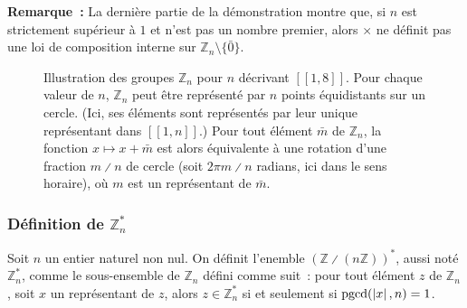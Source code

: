 \medskip

\noindent\textbf{Remarque :} La dernière partie de la démonstration montre que, si $n$ est strictement supérieur à $1$ et n'est pas un nombre premier, alors $\times$ ne définit pas une loi de composition interne sur $\mathbb{Z}_n \setminus \lbrace \bar{0} \rbrace$.

\begin{figure}
    \centering
    \def\maxN{8}
    \caption{Illustration des groupes $\mathbb{Z}_n$ pour $n$ décrivant $[\![1, \maxN]\!]$. 
        Pour chaque valeur de $n$, $\mathbb{Z}_n$ peut être représenté par $n$ points équidistants sur un cercle. 
        (Ici, ses éléments sont représentés par leur unique représentant dans $[\![1, n]\!]$.) 
        Pour tout élément $\bar{m}$ de $\mathbb{Z}_n$, la fonction $x \mapsto x + \bar{m}$ est alors équivalente à une rotation d'une fraction $m \divslash n$ de cercle (soit $2 \pi m \divslash n$ radians, ici dans le sens horaire), où $m$ est un représentant de $\bar{m}$.
        }
    \label{fig:ZqZ_circle}
\end{figure}

\subsubsection{Définition de \texorpdfstring{$\mathbb{Z}_n^*$}{Zn*}}

Soit $n$ un entier naturel non nul. 
On définit l'enemble $\left( \mathbb{Z} \divslash (n \mathbb{Z}) \right)^*$, aussi noté $\mathbb{Z}_n^*$, comme le sous-ensemble de $\mathbb{Z}_n$ défini comme suit : pour tout élément $z$ de $\mathbb{Z}_n$, soit $x$ un représentant de $z$, alors $z \in \mathbb{Z}_n^*$ si et seulement si $\mathrm{pgcd}(\left\lvert x \right\rvert, n) = 1$.


